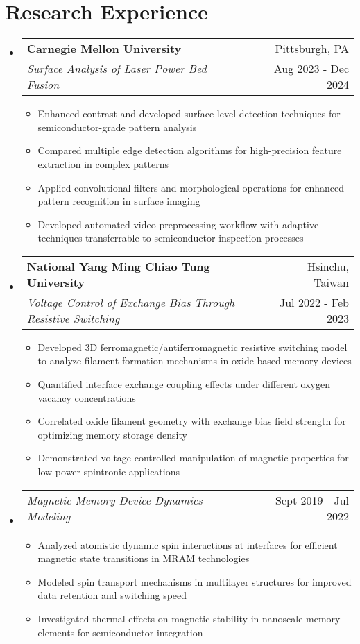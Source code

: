\documentclass[a4paper,11pt]{article}
\makeatletter
\newcommand{\resumeItem}[1]{
  \item\small{
    {#1 \vspace{-1pt}}
  }
}
\newcommand{\resumeDoubleHeading}[4]{
  \vspace{-2pt}\item
    \begin{tabular*}{0.97\textwidth}[t]{l@{\extracolsep{\fill}}r}
        \textbf{#1} & #2 \\
        \textit{\small#3} & {\small #4} \\
    \end{tabular*}\vspace{-5pt}
}
\newcommand{\resumeSubheading}[2]{
  \vspace{-2pt}\item
    \begin{tabular*}{0.97\textwidth}[t]{l@{\extracolsep{\fill}}r}
      \textit{\small#1} & {\small #2} \\
    \end{tabular*}\vspace{-5pt}
}
\newcommand{\resumeSubHeadingListStart}{\begin{itemize}[leftmargin=0.15in, label={}]}
\newcommand{\resumeSubHeadingListEnd}{\end{itemize}}
\newcommand{\resumeItemListStart}{\begin{itemize}}
\newcommand{\resumeItemListEnd}{\end{itemize}\vspace{-5pt}}
\makeatother
\begin{document}

\section{Research Experience}
  \resumeSubHeadingListStart
  \resumeDoubleHeading
    {Carnegie Mellon University}{Pittsburgh, PA}
    {Surface Analysis of Laser Power Bed Fusion}{Aug 2023 - Dec 2024}
        \resumeItemListStart
            \resumeItem{Enhanced contrast and developed surface-level detection techniques for semiconductor-grade pattern analysis}
            \resumeItem{Compared multiple edge detection algorithms for high-precision feature extraction in complex patterns}
            \resumeItem{Applied convolutional filters and morphological operations for enhanced pattern recognition in surface imaging}
            \resumeItem{Developed automated video preprocessing workflow with adaptive techniques transferrable to semiconductor inspection processes}
        \resumeItemListEnd
    \resumeDoubleHeading
    {National Yang Ming Chiao Tung University}{Hsinchu, Taiwan}
    {Voltage Control of Exchange Bias Through Resistive Switching}{Jul 2022 - Feb 2023}
    \resumeItemListStart
        \resumeItem{Developed 3D ferromagnetic/antiferromagnetic resistive switching model to analyze filament formation mechanisms in oxide-based memory devices}
        \resumeItem{Quantified interface exchange coupling effects under different oxygen vacancy concentrations}
        \resumeItem{Correlated oxide filament geometry with exchange bias field strength for optimizing memory storage density}
        \resumeItem{Demonstrated voltage-controlled manipulation of magnetic properties for low-power spintronic applications}
    \resumeItemListEnd

    \resumeSubheading{Magnetic Memory Device Dynamics Modeling}{Sept 2019 - Jul 2022}
        \resumeItemListStart
            \resumeItem{Analyzed atomistic dynamic spin interactions at interfaces for efficient magnetic state transitions in MRAM technologies}
            \resumeItem{Modeled spin transport mechanisms in multilayer structures for improved data retention and switching speed}
            \resumeItem{Investigated thermal effects on magnetic stability in nanoscale memory elements for semiconductor integration}
        \resumeItemListEnd

  \resumeSubHeadingListEnd
\end{document}
